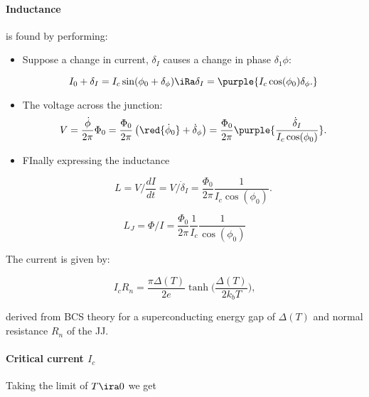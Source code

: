 \paragraph{Inductance} is found by performing:

\begin{itemize}
\item Suppose a change in current, $ \delta_I $ causes a change in phase
  $ \delta_1\phi $:

    \begin{equation}\label{key}
      I_0 + \delta_I = I_c\sin(\phi_0+\delta_\phi) \iRa \delta_I = \purple{I_c\cos(\phi_0)\delta_\phi.}
    \end{equation}
  \item The voltage across the junction:
    \begin{equation}\label{key}
      V = \frac{\dot{\phi}}{2\pi}\Phi_0 = \frac{\Phi_0}{2\pi}\left(\red{\dot{\phi}_0} + \dot{\delta}_\phi\right) =  \frac{\Phi_0}{2\pi}\purple{\frac{\dot{\delta}_I}{I_c\cos(\phi_0)}}.
    \end{equation}

  \item FInally expressing the inductance

    \begin{equation}\label{key}
      L = V/\frac{dI}{dt} = V/\dot{\delta}_I = \frac{\Phi_0}{2\pi}\frac{1}{I_c\cos(\phi_0)}.
    \end{equation}
  \end{itemize}

  \begin{framed}\noindent
    \begin{equation}\label{key} L_J = \Phi/I =
      \frac{\Phi_0}{2\pi}\frac{1}{I_c}\frac{1}{\cos(\phi_0)}
    \end{equation}
  \end{framed}

  \noindent The current is given by:

   \begin{equation}\label{introducing-qed-operators-critical-current}
     I_cR_n = \frac{\pi\Delta(T)}{2e}\tanh\big(\frac{\Delta(T)}{2k_bT}\big),
   \end{equation}

   \noindent derived from BCS theory for a superconducting energy gap of
   $ \Delta(T) $ and normal resistance $ R_n $ of the JJ.

   \paragraph{Critical current $ I_c $}
   Taking the limit of $ T\ira0 $ we get


